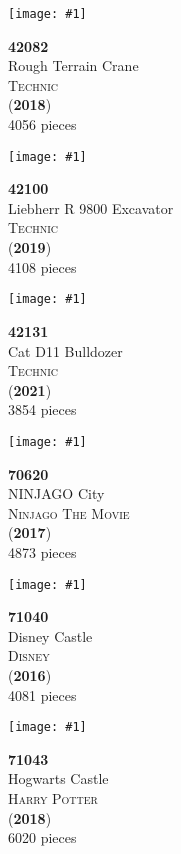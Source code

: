 \documentclass[letterpaper]{article}%
\newenvironment{legocell}[1]
{
	\begin{minipage}[c][2.0in][c]{4in}
	\centering
	\varwidth{3.6in}
	\raggedright %
	\begin{minipage}[c]{1.3in}
		\texttt{[image: \#1]}
	\end{minipage}
	\begin{minipage}[c]{2.2in}
	\raggedright
}
{
	\end{minipage}
	\endvarwidth
	\end{minipage}
	\allowbreak
	\ignorespaces
}
\begin{document}
\begin{legocell}{images/set_42082-1.jpg}
\textbf{42082}\\
{\sffamily\large Rough Terrain Crane}\\
\textsc{\color{DarkBlue}\normalsize Technic}\\
(\textbf{2018})\\
{\normalsize 4056 pieces}\\
\end{legocell}
\begin{legocell}{images/set_42100-1.jpg}
\textbf{42100}\\
{\sffamily\large Liebherr R 9800 Excavator}\\
\textsc{\color{DarkBlue}\normalsize Technic}\\
(\textbf{2019})\\
{\normalsize 4108 pieces}\\
\end{legocell}
\begin{legocell}{images/set_42131-1.jpg}
\textbf{42131}\\
{\sffamily\large Cat D11 Bulldozer}\\
\textsc{\color{DarkBlue}\normalsize Technic}\\
(\textbf{2021})\\
{\normalsize 3854 pieces}\\
\end{legocell}
\begin{legocell}{images/set_70620-1.jpg}
\textbf{70620}\\
{\sffamily\large NINJAGO City}\\
\textsc{\color{DarkBlue}\normalsize Ninjago The Movie}\\
(\textbf{2017})\\
{\normalsize 4873 pieces}\\
\end{legocell}
\begin{legocell}{images/set_71040-1.jpg}
\textbf{71040}\\
{\sffamily\large Disney Castle}\\
\textsc{\color{DarkBlue}\normalsize Disney}\\
(\textbf{2016})\\
{\normalsize 4081 pieces}\\
\end{legocell}
\begin{legocell}{images/set_71043-1.jpg}
\textbf{71043}\\
{\sffamily\large Hogwarts Castle}\\
\textsc{\color{DarkBlue}\normalsize Harry Potter}\\
(\textbf{2018})\\
{\normalsize 6020 pieces}\\
\end{legocell}
\end{document}
